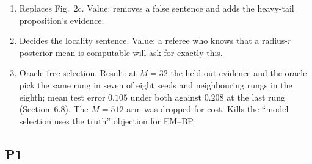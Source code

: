 \begin{enumerate}[label=\textbf{P0.\arabic*}]
\item {} Replaces Fig.~2c. Value: removes a false sentence and adds the heavy-tail proposition's evidence.
\item {} Decides the locality sentence. Value: a referee who knows that a radius-$r$ posterior mean is computable will ask for exactly this.
\item {} Oracle-free selection. Result: at $M=32$ the held-out evidence and the oracle pick the same rung in seven of eight seeds and neighbouring rungs in the eighth; mean test error $0.105$ under both against $0.208$ at the last rung (Section~6.8). The $M=512$ arm was dropped for cost. Kills the ``model selection uses the truth'' objection for EM--BP.
\end{enumerate}

\subsection*{P1}

